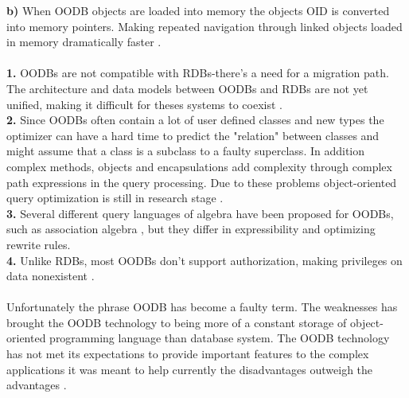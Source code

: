 \documentclass{cslthse-msc}
\begin{document}
\textbf{b)} When OODB objects are loaded into memory the objects OID is converted into memory pointers. Making repeated navigation through linked objects loaded in memory dramatically faster \cite{userdefinedabstractions}.\\\\\textbf{1.} OODBs are not compatible with RDBs-there's a need for a migration path. The architecture and data models between OODBs and RDBs are not yet unified, making it difficult for theses systems to coexist \cite{userdefinedabstractions}. \\\textbf{2.} Since OODBs often contain a lot of user defined classes and new types the optimizer can have a hard time to predict the "relation" between classes and might assume that a class is a subclass to a faulty superclass. In addition complex methods, objects and encapsulations add complexity through complex path expressions in the query processing. Due to these problems object-oriented query optimization is still in research stage \cite{OODBqopt}. \\\textbf{3.} Several different query languages of algebra have been proposed for OODBs, such as association algebra \cite{associationalg}, but they differ in expressibility and optimizing rewrite rules. \\\textbf{4.} Unlike RDBs, most OODBs don't support authorization, making privileges on data nonexistent \cite{userdefinedabstractions}.\\\\
Unfortunately the phrase OODB has become a faulty term. The weaknesses has brought the OODB technology to being more of a constant storage of object-oriented programming language than database system. The OODB technology has not met its expectations to provide important features to the complex applications it was meant to help currently the disadvantages outweigh the advantages \cite{OODBMS}.
\end{document}
